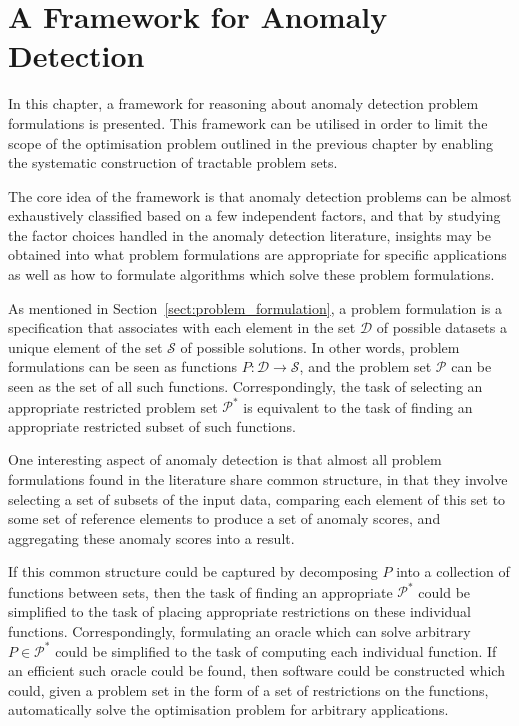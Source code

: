 \chapter{A Framework for Anomaly Detection}
\label{ch:framework}

In this chapter, a framework for reasoning about anomaly detection problem formulations is presented. This framework can be utilised in order to limit the scope of the optimisation problem outlined in the previous chapter by enabling the systematic construction of tractable problem sets.

The core idea of the framework is that anomaly detection problems can be almost exhaustively classified based on a few independent factors, and that by studying the factor choices handled in the anomaly detection literature, insights may be obtained into what problem formulations are appropriate for specific applications as well as how to formulate algorithms which solve these problem formulations.

As mentioned in Section~\ref{sect:problem_formulation}, a problem formulation is a specification that associates with each element in the set $\mathcal{D}$ of possible datasets a unique element of the set $\mathcal{S}$ of possible solutions. In other words, problem formulations can be seen as functions $P: \mathcal{D} \rightarrow \mathcal{S}$, and the problem set $\mathcal{P}$ can be seen as the set of all such functions. Correspondingly, the task of selecting an appropriate restricted problem set $\mathcal{P}^*$ is equivalent to the task of finding an appropriate restricted subset of such functions.

One interesting aspect of anomaly detection is that almost all problem formulations found in the literature share common structure, in that they involve selecting a set of subsets of the input data, comparing each element of this set to some set of reference elements to produce a set of anomaly scores, and aggregating these anomaly scores into a result.

If this common structure could be captured by decomposing $P$ into a collection of functions between sets, then the task of finding an appropriate $\mathcal{P}^*$ could be simplified to the task of placing appropriate restrictions on these individual functions. Correspondingly, formulating an oracle which can solve arbitrary $P \in \mathcal{P}^*$ could be simplified to the task of computing each individual function. If an efficient such oracle could be found, then software could be constructed which could, given a problem set in the form of a set of restrictions on the functions, automatically solve the optimisation problem for arbitrary applications.

